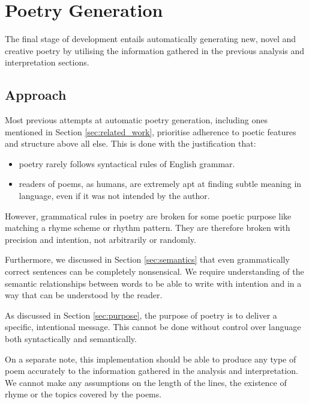\chapter{Poetry Generation}
\ifpdf
    \graphicspath{{Management/ManagementFigs/PNG/}{Management/ManagementFigs/PDF/}{Management/ManagementFigs/}}
\else
    \graphicspath{{Management/ManagementFigs/EPS/}{Management/ManagementFigs/}}
\fi

The final stage of development entails automatically generating new, novel and creative poetry by utilising the information gathered in the previous analysis and interpretation sections.

\section{Approach}
Most previous attempts at automatic poetry generation, including ones mentioned in Section \ref{sec:related_work}, prioritise adherence to poetic features and structure above all else. This is done with the justification that:
\begin{itemize}
\item{poetry rarely follows syntactical rules of English grammar.}
\item{readers of poems, as humans, are extremely apt at finding subtle meaning in language, even if it was not intended by the author.}
\end{itemize}

However, grammatical rules in poetry are broken for some poetic purpose like matching a rhyme scheme or rhythm pattern. They are therefore broken with precision and intention, not arbitrarily or randomly.

Furthermore, we discussed in Section \ref{sec:semantics} that even grammatically correct sentences can be completely nonsensical. We require understanding of the semantic relationships between words to be able to write with intention and in a way that can be understood by the reader.

As discussed in Section \ref{sec:purpose}, the purpose of poetry is to deliver a specific, intentional message. This cannot be done without control over language both syntactically and semantically.

On a separate note, this implementation should be able to produce any type of poem accurately to the information gathered in the analysis and interpretation. We cannot make any assumptions on the length of the lines, the existence of rhyme or the topics covered by the poems.

